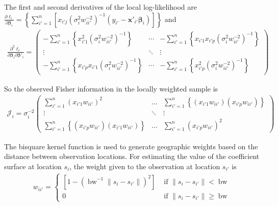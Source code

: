 \documentclass[authoryear, review, 11pt]{elsarticle}
\DeclareMathOperator*{\bw}{\mbox{bw}}
\begin{document}
	The first and second derivatives of the local log-likelihood are $\frac{\partial \ell_i}{\partial \bm{\beta}_i} =  \left\{ \sum_{i'=1}^n \left[ x_{i'j} \left( \sigma^2_i w^{-2}_{ii'} \right)^{-1} \left( y_{i'} - \bm{x}'_{i'} \bm{\beta}_i \right) \right] \right\}$ and 
	\begin{eqnarray}
		\frac{\partial^2 \ell_i}{\partial \bm{\beta}_i \partial \bm{\beta}'_i} = \left( \begin{array}{ccc} -\sum_{i'=1}^n \left\{ x^2_{i'1} \left( \sigma^2_i w^{-2}_{ii'} \right)^{-1} \right\}  & \cdots & -\sum_{i'=1}^n \left\{ x_{i'1} x_{i'p} \left( \sigma^2_i w^{-2}_{ii'} \right)^{-1} \right\} \\ \vdots & \ddots & \vdots \\ -\sum_{i'=1}^n \left\{ x_{i'p} x_{i'1} \left( \sigma^2_i w^{-2}_{ii'} \right)^{-1} \right\}  & \cdots & -\sum_{i'=1}^n \left\{ x^2_{i'p} \left( \sigma^2_i w^{-2}_{ii'} \right)^{-1} \right\} \end{array} \right)
	\end{eqnarray}
	
	So the observed Fisher information in the locally weighted sample is	
	\begin{eqnarray}
		\mathcal{J}_i = \sigma^{-2}_i \left( \begin{array}{ccc} \sum_{i'=1}^n \left( x_{i'1} w_{ii'} \right)^2 & \dots & \sum_{i'=1}^n \left\{ \left(x_{i'1} w_{ii'}\right) \left(x_{i'p} w_{ii'}\right) \right\} \\ \vdots & \ddots & \vdots \\ \sum_{i'=1}^n \left\{ \left(x_{i'p} w_{ii'}\right) \left(x_{i'1} w_{ii'}\right)  \right\} & \dots & \sum_{i'=1}^n \left( x_{i'p} w_{ii'} \right)^2 \end{array} \right)
	\end{eqnarray}	
	
	The bisquare kernel function is used to generate geographic weights based on the distance between observation locations. For estimating the value of the coefficient surface at location $s_i$, the weight given to the observation at location $s_{i'}$ is	
	\begin{eqnarray}
		w_{ii'} = \begin{cases} \left[ 1-\left( \bw^{-1} \|s_i-s_{i'}\| \right)^2 \right] & \mbox{ if } \|s_i-s_{i'}\| < \bw \\ 0 & \mbox{ if } \|s_i-s_{i'}\| \geq \bw \end{cases}
	\end{eqnarray}
	
\end{document}
